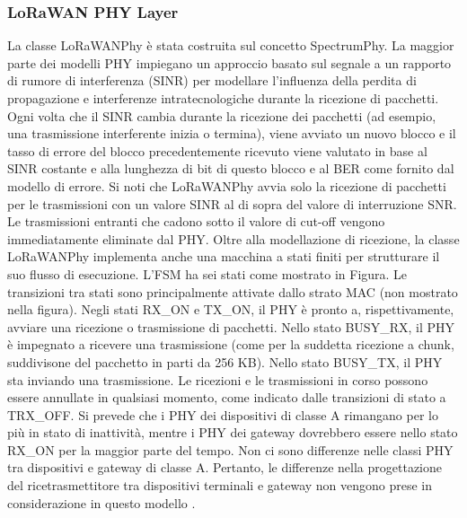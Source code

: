 \documentclass[a4paper]{report} %
\begin{document}
\subsubsection{LoRaWAN PHY Layer}
La classe LoRaWANPhy è stata costruita sul concetto SpectrumPhy. La maggior parte dei modelli PHY impiegano un approccio basato sul segnale a un rapporto di rumore di interferenza (SINR) per modellare l'influenza della perdita di propagazione e interferenze intratecnologiche durante la ricezione di pacchetti. Ogni volta che il SINR cambia durante la ricezione dei pacchetti (ad esempio, una trasmissione interferente inizia o termina), viene avviato un nuovo blocco e il tasso di errore del blocco precedentemente ricevuto viene valutato in base al SINR costante e alla lunghezza di bit di questo blocco e al BER come fornito dal modello di errore. Si noti che LoRaWANPhy avvia solo la ricezione di pacchetti per le trasmissioni con un valore SINR al di sopra del valore di interruzione SNR. Le trasmissioni entranti che cadono sotto il valore di cut-off vengono immediatamente eliminate dal PHY. Oltre alla modellazione di ricezione, la classe LoRaWANPhy implementa anche una macchina a stati finiti per strutturare il suo flusso di esecuzione. L'FSM ha sei stati come mostrato in Figura. Le transizioni tra stati sono principalmente attivate dallo strato MAC (non mostrato nella figura). Negli stati RX\_ON e TX\_ON, il PHY è pronto a, rispettivamente, avviare una ricezione o trasmissione di pacchetti. Nello stato BUSY\_RX, il PHY è impegnato a ricevere una trasmissione (come per la suddetta ricezione a chunk, suddivisone del pacchetto in parti da 256 KB). Nello stato BUSY\_TX, il PHY sta inviando una trasmissione. Le ricezioni e le trasmissioni in corso possono essere annullate in qualsiasi momento, come indicato dalle transizioni di stato a TRX\_OFF. Si prevede che i PHY dei dispositivi di classe A rimangano per lo più in stato di inattività, mentre i PHY dei gateway dovrebbero essere nello stato RX\_ON per la maggior parte del tempo. Non ci sono differenze nelle classi PHY tra dispositivi e gateway di classe A. Pertanto, le differenze nella progettazione del ricetrasmettitore tra dispositivi terminali e gateway non vengono prese in considerazione in questo modello \cite{art:rif.49}.
\end{document}
